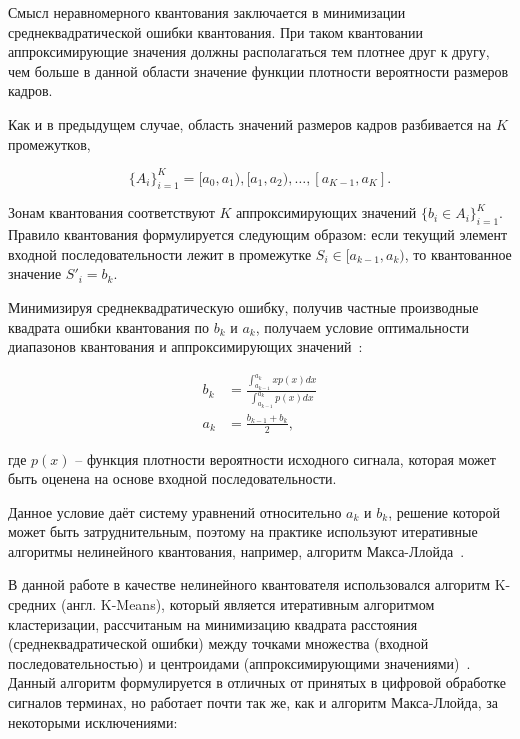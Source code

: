 Смысл неравномерного квантования заключается в минимизации
среднеквадратической ошибки квантования. При таком квантовании
аппроксимирующие значения должны располагаться тем плотнее
друг к другу, чем больше в данной области значение функции
плотности вероятности размеров кадров.

Как и в предыдущем случае, область значений размеров кадров
разбивается на $K$ промежутков,

\begin{equation}
    \{A_i\} _{i=1}^K = {[a_0, a_1), [a_1, a_2), \dots, [a_{K-1}, a_K]}.
\end{equation}

Зонам квантования соответствуют $K$ аппроксимирующих значений
$\{b_i \in A_i\} _{i=1}^K$. Правило квантования формулируется следующим
образом: если текущий элемент входной последовательности
лежит в промежутке $S_i \in [a_{k-1}, a_k)$, то квантованное
значение $S'_i = b_k$.

Минимизируя среднеквадратическую ошибку, получив частные
производные квадрата ошибки квантования по $b_k$ и $a_k$, получаем
условие оптимальности диапазонов квантования и аппроксимирующих
значений~\cite{digitalSignalProcessing}:

\begin{equation}
    \begin{aligned}
        b_k &= \frac{\int_{a_{k-1}}^{a_k} x p(x) dx}{\int_{a_{k-1}}^{a_k} p(x) dx} \\
        a_k &= \frac{b_{k-1} + b_k}{2},
    \end{aligned}
\end{equation}

где $p(x)$ -- функция плотности вероятности исходного сигнала,
которая может быть оценена на основе входной последовательности.

Данное условие даёт систему уравнений относительно $a_k$ и $b_k$,
решение которой может быть затруднительным, поэтому на практике
используют итеративные алгоритмы нелинейного квантования, например,
алгоритм Макса-Ллойда~\cite{lloydmax}.

В данной работе в качестве нелинейного квантователя использовался
алгоритм K-средних (англ. K-Means),
который является итеративным алгоритмом кластеризации,
рассчитаным на минимизацию квадрата расстояния (среднеквадратической ошибки)
между точками множества (входной последовательностью) и центроидами
(аппроксимирующими значениями)~\cite{kmeans}. Данный алгоритм
формулируется в отличных от принятых в цифровой обработке
сигналов терминах, но работает почти так же, как и алгоритм
Макса-Ллойда, за некоторыми исключениями:

